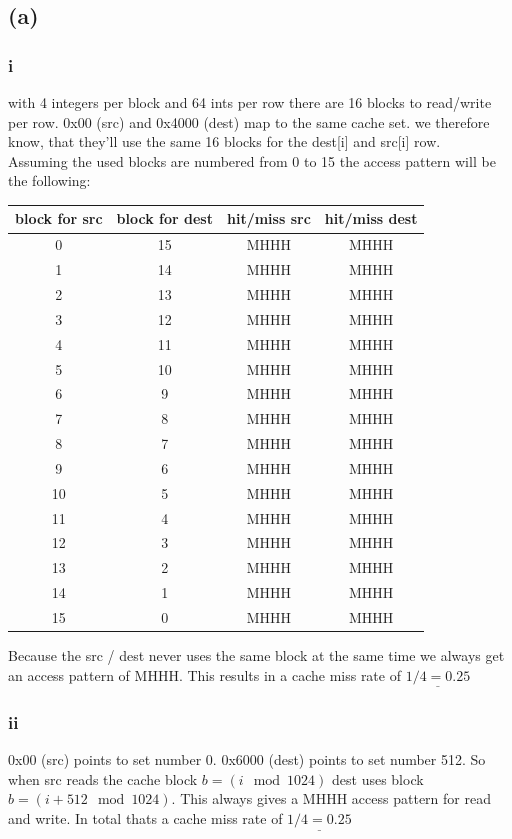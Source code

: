 \documentclass[10pt,a4paper,oneside,notitlepage]{report}
\begin{document}
\subsection*{(a)}
\subsubsection*{i}
with 4 integers per block and 64 ints per row there are 16 blocks to read/write per row. 0x00 (src) and 0x4000 (dest) map to the same cache set. we therefore know, that they'll use the same 16 blocks for the dest[i] and src[i] row.  \\ Assuming the used blocks are numbered from 0 to 15 the access pattern will be the following: \\

\begin{tabular}{|c|c|c|c|}
\hline 
\rowcolor{gray!30}
\textbf{block for src} &\textbf{ block for dest} & \textbf{hit/miss src} & \textbf{hit/miss dest} \\ 
\hline 
0 & 15 & MHHH & MHHH \\ 
\hline 
1 & 14 & MHHH & MHHH \\ 
\hline 
2 & 13 & MHHH & MHHH \\ 
\hline 
3 & 12 & MHHH & MHHH \\ 
\hline 
4 & 11 & MHHH & MHHH \\ 
\hline 
5 & 10 & MHHH & MHHH \\ 
\hline 
6 & 9 & MHHH & MHHH \\ 
\hline 
7 & 8 & MHHH & MHHH \\ 
\hline 
8 & 7 & MHHH & MHHH \\ 
\hline 
9 & 6 & MHHH & MHHH \\ 
\hline 
10 & 5 & MHHH & MHHH \\ 
\hline 
11 & 4 & MHHH & MHHH \\ 
\hline 
12 & 3 & MHHH & MHHH \\ 
\hline 
13 & 2 & MHHH & MHHH \\ 
\hline 
14 & 1 & MHHH & MHHH \\ 
\hline 
15 & 0 & MHHH & MHHH \\ 
\hline 
\end{tabular} 

Because the src / dest never uses the same block at the same time we always get an access pattern of MHHH. This results in a cache miss rate of $\underline{1/4=0.25}$

\subsubsection*{ii}
0x00 (src) points to set number 0. 0x6000 (dest) points to set number 512.
So when src reads the cache block $b=(i \mod 1024)$ dest uses block $b=(i+512 \mod 1024)$. This always gives a MHHH access pattern for read and write. In total thats a cache miss rate of $\underline{1/4=0.25}$
\end{document}
